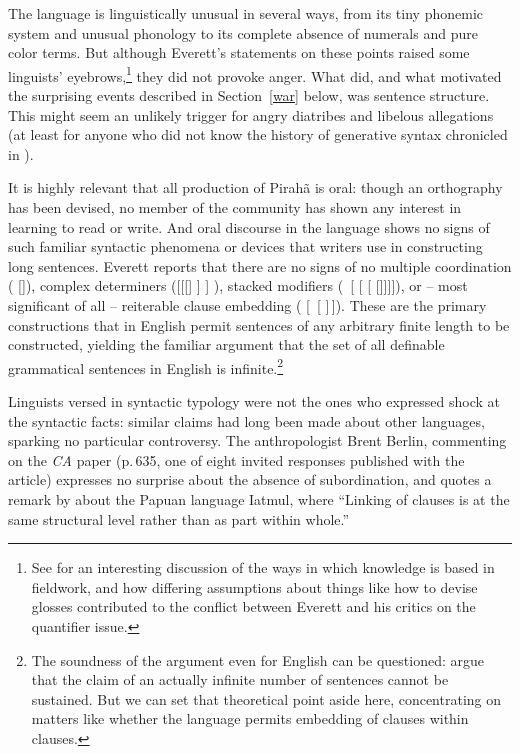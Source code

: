 \documentclass[output=paper,colorlinks,citecolor=brown
]{langscibook}
\begin{document}
The language is linguistically unusual in several ways, from its tiny
phonemic system and unusual phonology to its complete absence of
numerals and pure color terms. But although Everett's statements on
these points raised some linguists' eyebrows,\footnote{%
   See \citealt{DobrSchw21} for an interesting discussion of the ways
   in which knowledge is based in fieldwork, and how differing assumptions
   about things like how to devise glosses contributed to the conflict
   between Everett and his critics on the quantifier issue.}
they did not provoke anger. What did, and what motivated the surprising
events described in Section~\ref{war} below, was sentence structure.
This might seem an unlikely trigger for angry diatribes and libelous
allegations (at least for anyone who did not know the history of
generative syntax chronicled in \citealt{Harris21}).

It is highly relevant that all production of Pirah{\~a} is oral:
though an orthography has been devised, no member of the community
has shown any interest in learning to read or write. And oral
discourse in the language shows no signs of such familiar syntactic
phenomena or devices that writers use in constructing long sentences.
Everett reports that there are no signs of no multiple coordination
( []),
complex determiners ([[[] ] ]
), stacked modifiers (~[ [
[ []]]]), or -- most significant
of all -- reiterable clause embedding ( [\, [\,\,]\,]). These are the primary
constructions that in English permit sentences of any arbitrary finite
length to be constructed, yielding the familiar argument that the set
of all definable grammatical sentences in English is
infinite.\footnote{%
   The soundness of the argument even for English can be questioned:
   \citet[115--124]{PullScho10} argue that the
   claim of an actually infinite number of sentences cannot be
   sustained. But we can set that theoretical point aside here,
   concentrating on matters like whether the language permits
   embedding of clauses within clauses.}

\label{page-non-infinite-languages-start}Linguists versed in syntactic typology were not the ones who expressed
shock at the syntactic facts: similar claims had long been made about
other languages, sparking no particular controversy. The anthropologist
Brent Berlin, commenting on the \textit{CA} paper (p.\,635, one of
eight invited responses published with the article) expresses no
surprise about the absence of subordination, and quotes a remark by
\citet[177]{Foley86} about the Papuan language Iatmul, where
``Linking of clauses is at the same structural level rather than as
part within whole.''
\end{document}
